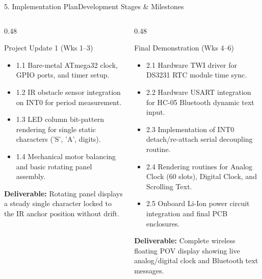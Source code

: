 \documentclass[aspectratio=169, 10pt]{beamer}
\begin{document}
\begin{frame}{5. Implementation Plan}{Development Stages \& Milestones}
    \begin{columns}[T]
        \begin{column}{0.48\textwidth}
            \begin{block}{Project Update 1 (Wks 1--3)}
                \footnotesize
                \begin{itemize}
                    \item 1.1 Bare-metal ATmega32 clock, GPIO ports, and timer setup.
                    \item 1.2 IR obstacle sensor integration on INT0 for period measurement.
                    \item 1.3 LED column bit-pattern rendering for single static characters ('S', 'A', digits).
                    \item 1.4 Mechanical motor balancing and basic rotating panel assembly.
                \end{itemize}
                \textbf{Deliverable:} Rotating panel displays a steady single character locked to the IR anchor position without drift.
            \end{block}
        \end{column}
        \begin{column}{0.48\textwidth}
            \begin{block}{Final Demonstration (Wks 4--6)}
                \footnotesize
                \begin{itemize}
                    \item 2.1 Hardware TWI driver for DS3231 RTC module time sync.
                    \item 2.2 Hardware USART integration for HC-05 Bluetooth dynamic text input.
                    \item 2.3 Implementation of INT0 detach/re-attach serial decoupling routine.
                    \item 2.4 Rendering routines for Analog Clock (60 slots), Digital Clock, and Scrolling Text.
                    \item 2.5 Onboard Li-Ion power circuit integration and final PCB enclosures.
                \end{itemize}
                \textbf{Deliverable:} Complete wireless floating POV display showing live analog/digital clock and Bluetooth text messages.
            \end{block}
        \end{column}
    \end{columns}
\end{frame}
\end{document}
